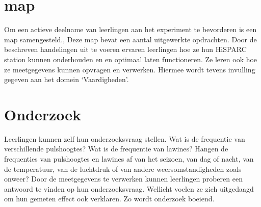 \section{\hisparc map}

Om een actieve deelname van leerlingen aan het \hisparc experiment te bevorderen is een \hisparc map samengesteld., Deze map bevat een aantal
uitgewerkte opdrachten. Door de beschreven handelingen uit
te voeren ervaren leerlingen hoe ze hun HiSPARC station kunnen
onderhouden en en optimaal laten functioneren. Ze leren ook hoe ze meetgegevens kunnen opvragen en verwerken. Hiermee wordt tevens invulling gegeven aan het domein `Vaardigheden'.  

\section{Onderzoek}
Leerlingen kunnen zelf hun
onderzoeksvraag stellen. Wat is de frequentie van verschillende pulshoogtes? Wat is de frequentie van lawines? Hangen de frequenties van pulshoogtes en lawines af van het
seizoen, van dag of nacht, van de temperatuur, van de luchtdruk of van
andere weersomstandigheden zoals onweer? Door de meetgegevens te verwerken kunnen leerlingen proberen een antwoord te vinden op hun onderzoeksvraag. Wellicht voelen ze zich uitgedaagd om hun gemeten effect ook verklaren. Zo wordt onderzoek boeiend. 


